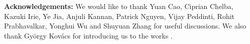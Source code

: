 \documentclass[a4paper]{article}
\begin{document}
\noindent
\textbf{Acknowledgements:}
We would like to thank Yuan Cao, Ciprian Chelba, Kazuki Irie, Ye Jia, Anjuli Kannan, Patrick Nguyen, Vijay Peddinti, Rohit Prabhavalkar, Yonghui Wu and Shuyuan Zhang for useful discussions. We also thank Gy\"orgy Kov\'acs for introducing us to the works \cite{kovacs2017increasing, toth2018perceptually}.





\end{document}
